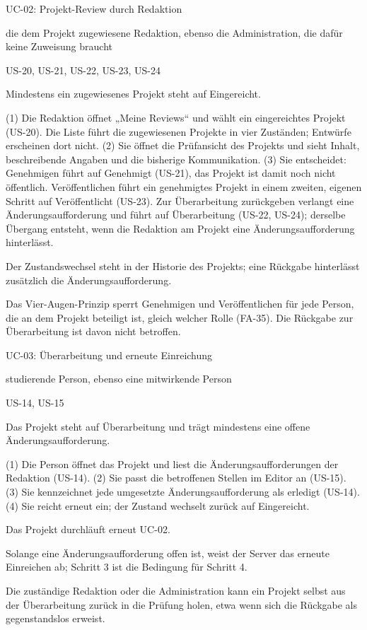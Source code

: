 \begin{usecase}{UC-02: Projekt-Review durch Redaktion}
	\item[Akteur:] die dem Projekt zugewiesene Redaktion, ebenso die Administration, die dafür keine Zuweisung braucht
	\item[Bezug:] US-20, US-21, US-22, US-23, US-24
	\item[Vorbedingung:] Mindestens ein zugewiesenes Projekt steht auf Eingereicht.
	\item[Ablauf:] (1) Die Redaktion öffnet „Meine Reviews“ und wählt ein eingereichtes Projekt (US-20). Die Liste führt die zugewiesenen Projekte in vier Zuständen; Entwürfe erscheinen dort nicht. (2) Sie öffnet die Prüfansicht des Projekts und sieht Inhalt, beschreibende Angaben und die bisherige Kommunikation. (3) Sie entscheidet: Genehmigen führt auf Genehmigt (US-21), das Projekt ist damit noch nicht öffentlich. Veröffentlichen führt ein genehmigtes Projekt in einem zweiten, eigenen Schritt auf Veröffentlicht (US-23). Zur Überarbeitung zurückgeben verlangt eine Änderungsaufforderung und führt auf Überarbeitung (US-22, US-24); derselbe Übergang entsteht, wenn die Redaktion am Projekt eine Änderungsaufforderung hinterlässt.
	\item[Nachbedingung:] Der Zustandswechsel steht in der Historie des Projekts; eine Rückgabe hinterlässt zusätzlich die Änderungsaufforderung.
	\item[Einschränkung:] Das Vier-Augen-Prinzip sperrt Genehmigen und Veröffentlichen für jede Person, die an dem Projekt beteiligt ist, gleich welcher Rolle (FA-35). Die Rückgabe zur Überarbeitung ist davon nicht betroffen.
\end{usecase}

\begin{usecase}{UC-03: Überarbeitung und erneute Einreichung}
	\item[Akteur:] studierende Person, ebenso eine mitwirkende Person
	\item[Bezug:] US-14, US-15
	\item[Vorbedingung:] Das Projekt steht auf Überarbeitung und trägt mindestens eine offene Änderungsaufforderung.
	\item[Ablauf:] (1) Die Person öffnet das Projekt und liest die Änderungsaufforderungen der Redaktion (US-14). (2) Sie passt die betroffenen Stellen im Editor an (US-15). (3) Sie kennzeichnet jede umgesetzte Änderungsaufforderung als erledigt (US-14). (4) Sie reicht erneut ein; der Zustand wechselt zurück auf Eingereicht.
	\item[Nachbedingung:] Das Projekt durchläuft erneut UC-02.
	\item[Fehlerfall:] Solange eine Änderungsaufforderung offen ist, weist der Server das erneute Einreichen ab; Schritt 3 ist die Bedingung für Schritt 4.
	\item[Alternativablauf:] Die zuständige Redaktion oder die Administration kann ein Projekt selbst aus der Überarbeitung zurück in die Prüfung holen, etwa wenn sich die Rückgabe als gegenstandslos erweist.
\end{usecase}

